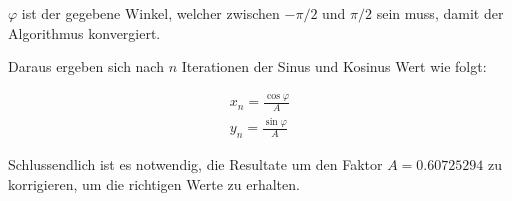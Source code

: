 \(\varphi\) ist der gegebene Winkel, welcher zwischen \(-\pi/2\) und \(\pi/2\) sein muss, damit der Algorithmus konvergiert.

Daraus ergeben sich nach \(n\) Iterationen der Sinus und Kosinus Wert wie folgt:

\begin{equation}
\begin{aligned}
x_n = \frac{\cos{\varphi}}{A} \\
y_n = \frac{\sin{\varphi}}{A}
\end{aligned}
\label{equ:cordic_6}
\end{equation} 

Schlussendlich ist es notwendig, die Resultate um den Faktor \(A = 0.60725294\) zu korrigieren, um die richtigen Werte zu erhalten.

